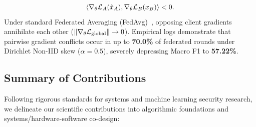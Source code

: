 \begin{itemize}
    \begin{equation}
    \label{eq:intro_cancellation}
    \left\langle\nabla_\theta \mathcal{L}_A(\tilde{x}_A),\nabla_\theta \mathcal{L}_B(x_B)\right\rangle < 0.
    \end{equation}
    Under standard Federated Averaging (FedAvg)~\cite{mcmahan2017communication}, opposing client gradients annihilate each other ($\left\lVert\nabla_\theta \mathcal{L}_{\text{global}}\right\rVert \to 0$). Empirical logs demonstrate that pairwise gradient conflicts occur in up to \textbf{70.0\%} of federated rounds under Dirichlet Non-IID skew ($\alpha = 0.5$), severely depressing Macro F1 to \textbf{57.22\%}.
\end{itemize}

\subsection{Summary of Contributions}
Following rigorous standards for systems and machine learning security research, we delineate our scientific contributions into algorithmic foundations and systems/hardware-software co-design:

